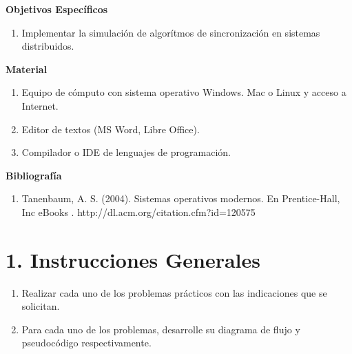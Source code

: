 \documentclass[12pt]{article}
\begin{document}
\begin{tcolorbox}
    \begin{center}
        \textbf{Objetivos Específicos}
    \end{center}
    \begin{enumerate}
        \item Implementar la simulación de algorítmos de sincronización en sistemas distribuidos.
    \end{enumerate}
    \vspace{0.1cm}
\end{tcolorbox}

\begin{tcolorbox}
    \begin{center}
        \textbf{Material}
    \end{center}
    \begin{enumerate}
        \item Equipo de cómputo con sistema operativo Windows. Mac o Linux y acceso a Internet.
        \item Editor de textos (MS Word, Libre Office).
        \item Compilador o IDE de lenguajes de programación.
    \end{enumerate}
    \vspace{0.1cm}
\end{tcolorbox}

\begin{tcolorbox}
    \begin{center}
        \textbf{Bibliografía}
    \end{center}
    \begin{enumerate}
        \item Tanenbaum, A. S. (2004). Sistemas operativos modernos. En Prentice-Hall, Inc eBooks . http://dl.acm.org/citation.cfm?id=120575
    \end{enumerate}
    \vspace{0.1cm}
\end{tcolorbox}

\newpage %
\pagestyle{fancy}

\section{\large 1. Instrucciones Generales}

\begin{enumerate}
    \item Realizar cada uno de los problemas prácticos con las indicaciones que se solicitan.
    \item Para cada uno de los problemas, desarrolle su diagrama de flujo y pseudocódigo respectivamente.
\end{enumerate}
\end{document}

